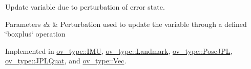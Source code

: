 Update variable due to perturbation of error state. 


\begin{DoxyParams}{Parameters}
{\em dx} & Perturbation used to update the variable through a defined \char`\"{}boxplus\char`\"{} operation \\
\hline
\end{DoxyParams}


Implemented in \hyperlink{classov__type_1_1IMU_ac40233687ffc481f5d4d1ebaaf882577}{ov\+\_\+type\+::\+I\+MU}, \hyperlink{classov__type_1_1Landmark_aae8c688f5bb601edcb38fde41ff04297}{ov\+\_\+type\+::\+Landmark}, \hyperlink{classov__type_1_1PoseJPL_a8c961e8638cdc37a2b37c1fa50fc67a2}{ov\+\_\+type\+::\+Pose\+J\+PL}, \hyperlink{classov__type_1_1JPLQuat_af0a26f1b03bc7c89abad5dfd985c61cd}{ov\+\_\+type\+::\+J\+P\+L\+Quat}, and \hyperlink{classov__type_1_1Vec_a7d66e9414946807c9469de0a1038256d}{ov\+\_\+type\+::\+Vec}.

